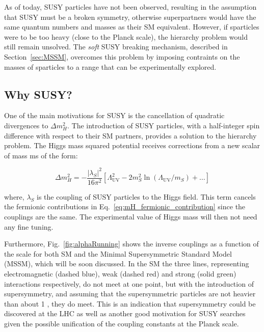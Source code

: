 		As of today, SUSY particles have not been observed, resulting in the assumption that SUSY must be a broken symmetry, otherwise superpartners would have the same quantum numbers and masses as their SM equivalent. However, if sparticles were to be too heavy (close to the Planck scale), the hierarchy problem would still remain unsolved. The \emph{soft} SUSY breaking mechanism, described in Section~\ref{sec:MSSM}, overcomes this problem by imposing contraints on the masses of sparticles to a range that can be experimentally explored. 		

		

		\subsection{Why SUSY?}
		\label{sec:whySUSY}			

			One of the main motivations for SUSY is the cancellation of quadratic divergences to $\Delta m_H^2$. 
			The introduction of SUSY particles, with a half-integer spin difference with respect to their SM partners, provides a solution to the hierarchy problem. The Higgs mass squared potential receives corrections from a new scalar of mass ms of the form:

			\begin{equation}
			\label{eq:mH_scalar_contribution}
			\Delta m_H^2 = - \frac{\left | \lambda_S \right |^2}{16 \pi ^2} \left [  \Lambda_{\mathrm{UV}}^2 - 2m_S^2 \ln \left (\Lambda_{\mathrm{UV}} / m_S \right) + \dots \right ]
			\end{equation}

			\noindent where, $\lambda_S$ is the coupling of SUSY particles to the Higgs field. This term cancels the fermionic contributions in Eq.~\ref{eq:mH_fermionic_contribution} since the couplings are the same. The experimental value of Higgs mass will then not need any fine tuning.

			Furthermore, Fig.~\ref{fig:alphaRunning} shows the inverse couplings as a function of the scale for both SM and the Minimal Supersymmetric Standard Model (MSSM), which will be soon discussed. In the SM the three lines, representing electromagnetic (dashed blue), weak (dashed red) and strong (solid green) interactions respectively, do not meet at one point, but with the introduction of supersymmetry, and assuming that the supersymmetric particles are not heavier than about 1 \TeV, they do meet. This is an indication that supersymmetry could be discovered at the LHC as well as another good motivation for SUSY searches given the possible unification of the coupling constants at the Planck scale. 

